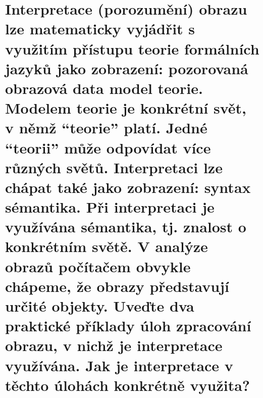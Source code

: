 \section{Interpretace (porozumění) obrazu lze matematicky vyjádřit s využitím přístupu teorie formálních jazyků jako 
zobrazení: pozorovaná obrazová data \rightarrow model teorie. Modelem teorie je konkrétní svět, v němž \enquote{teorie} 
platí. Jedné \enquote{teorii} může odpovídat více různých světů. Interpretaci lze chápat také jako zobrazení: syntax 
\rightarrow sémantika. Při interpretaci je využívána sémantika, tj. znalost o konkrétním světě. V analýze obrazů 
počítačem obvykle chápeme, že obrazy představují určité objekty. Uveďte dva praktické příklady úloh zpracování obrazu, 
v nichž je interpretace využívána. Jak je interpretace v těchto úlohách konkrétně využita?}